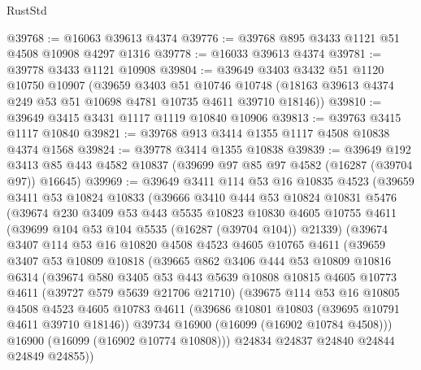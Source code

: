 \begin{lexlean}{RustStd}
\begin{coremodule}
@39768 := @16063 @39613 @4374
@39776 := @39768 @895 @3433 @1121 @51 @4508 @10908 @4297 @1316
@39778 := @16033 @39613 @4374
@39781 := @39778 @3433 @1121 @10908
@39804 := @39649
    @3403
    @3432
    @51
    @1120
    @10750
    @10907
    (@39659
      @3403
      @51
      @10746
      @10748
      (@18163 @39613 @4374 @249 @53 @51 @10698 @4781 @10735 @4611 @39710 @18146))
@39810 := @39649 @3415 @3431 @1117 @1119 @10840 @10906
@39813 := @39763 @3415 @1117 @10840
@39821 := @39768 @913 @3414 @1355 @1117 @4508 @10838 @4374 @1568
@39824 := @39778 @3414 @1355 @10838
@39839 := @39649
    @192
    @3413
    @85
    @443
    @4582
    @10837
    (@39699 @97 @85 @97 @4582 (@16287 (@39704 @97)) @16645)
@39969 := @39649
    @3411
    @114
    @53
    @16
    @10835
    @4523
    (@39659
      @3411
      @53
      @10824
      @10833
      (@39666
        @3410
        @444
        @53
        @10824
        @10831
        @5476
        (@39674
          @230
          @3409
          @53
          @443
          @5535
          @10823
          @10830
          @4605
          @10755
          @4611
          (@39699 @104 @53 @104 @5535 (@16287 (@39704 @104)) @21339)
          (@39674
            @3407
            @114
            @53
            @16
            @10820
            @4508
            @4523
            @4605
            @10765
            @4611
            (@39659
              @3407
              @53
              @10809
              @10818
              (@39665
                @862
                @3406
                @444
                @53
                @10809
                @10816
                @6314
                (@39674
                  @580
                  @3405
                  @53
                  @443
                  @5639
                  @10808
                  @10815
                  @4605
                  @10773
                  @4611
                  (@39727 @579 @5639 @21706 @21710)
                  (@39675
                    @114
                    @53
                    @16
                    @10805
                    @4508
                    @4523
                    @4605
                    @10783
                    @4611
                    (@39686 @10801 @10803 (@39695 @10791 @4611 @39710 @18146))
                    @39734
                    @16900
                    (@16099 (@16902 @10784 @4508)))
                  @16900
                  (@16099 (@16902 @10774 @10808)))
                @24834
                @24837
                @24840
                @24844
                @24849
                @24855))

\end{coremodule}
\end{lexlean}

